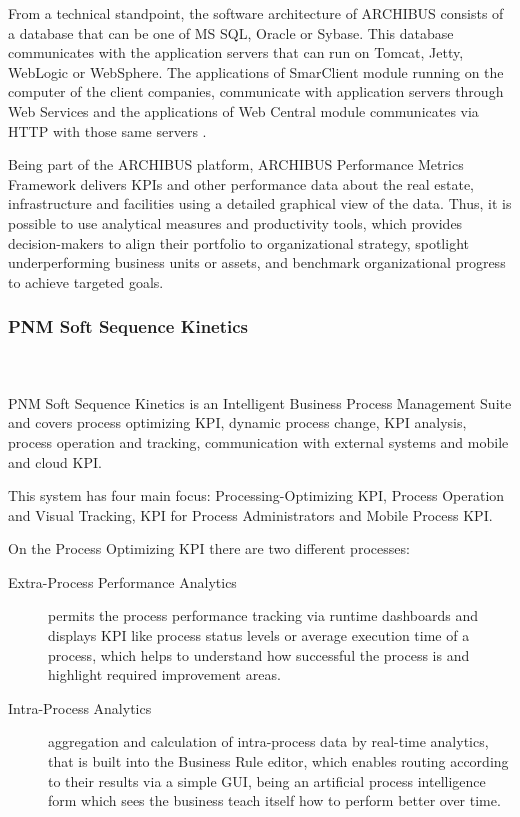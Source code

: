 From a technical standpoint, the software architecture of ARCHIBUS consists of a database that can be one of MS SQL, Oracle or Sybase. This database communicates with the application servers that can run on Tomcat, Jetty, WebLogic or WebSphere. The applications of SmarClient module running on the computer of the client companies, communicate with application servers through Web Services and the applications of Web Central module communicates via HTTP with those same servers \cite{ARCHI}.

Being part of the ARCHIBUS platform, ARCHIBUS Performance Metrics Framework delivers KPIs and other performance data about the real estate, infrastructure and facilities using a detailed graphical view of the data. Thus, it is possible to use analytical measures and productivity tools, which provides decision-makers to align their portfolio to organizational strategy, spotlight underperforming business units or assets, and benchmark organizational progress to achieve targeted goals.

\subsubsection{PNM Soft Sequence Kinetics}

\hfill \\ \\ PNM Soft Sequence Kinetics is an Intelligent Business Process Management Suite and covers process optimizing KPI, dynamic process change, KPI analysis, process operation and tracking, communication with external systems and mobile and cloud KPI.

This system has four main focus: Processing-Optimizing KPI, Process Operation and Visual Tracking, KPI for Process Administrators and Mobile Process KPI.

On the Process Optimizing KPI there are two different processes: 
\begin{description}
	\item  [Extra-Process Performance Analytics] permits the process performance tracking via runtime dashboards and displays KPI like process status levels or average execution time of a process, which helps to understand how successful the process is and highlight required improvement areas.\\

	\item  [Intra-Process Analytics] aggregation and calculation of intra-process data by real-time analytics, that is built into the Business Rule editor, which enables routing according to their results via a simple GUI, being an artificial process intelligence form which sees the business teach itself how to perform better over time.
\end{description}

